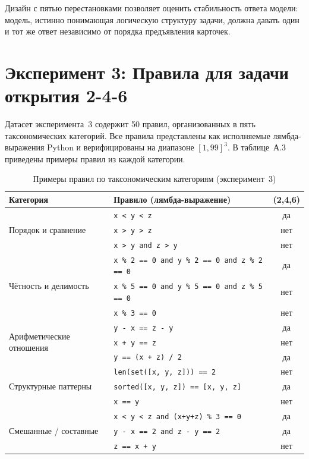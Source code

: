 Дизайн с пятью перестановками позволяет оценить стабильность ответа модели: модель, истинно понимающая логическую структуру задачи, должна давать один и тот же ответ независимо от порядка предъявления карточек.

\section{Эксперимент 3: Правила для задачи открытия 2-4-6}
\label{sec:appA_246}

Датасет эксперимента~3 содержит 50 правил, организованных в пять таксономических категорий. Все правила представлены как исполняемые лямбда-выражения Python и верифицированы на диапазоне $[1, 99]^3$. В таблице~А.3 приведены примеры правил из каждой категории.

\begin{table}[h!]
\caption{Примеры правил по таксономическим категориям (эксперимент~3)}
\label{tab:appA_rules}
\centering
\begin{tabular}{|l|l|c|}
\hline
\textbf{Категория} & \textbf{Правило (лямбда-выражение)} & \textbf{(2,4,6)} \\
\hline
\multirow{3}{*}{Порядок и сравнение}
  & \texttt{x < y < z} & да \\
  & \texttt{x > y > z} & нет \\
  & \texttt{x > y and z > y} & нет \\
\hline
\multirow{3}{*}{Чётность и делимость}
  & \texttt{x \% 2 == 0 and y \% 2 == 0 and z \% 2 == 0} & да \\
  & \texttt{x \% 5 == 0 and y \% 5 == 0 and z \% 5 == 0} & нет \\
  & \texttt{x \% 3 == 0} & нет \\
\hline
\multirow{3}{*}{Арифметические отношения}
  & \texttt{y - x == z - y} & да \\
  & \texttt{x + y == z} & нет \\
  & \texttt{y == (x + z) / 2} & да \\
\hline
\multirow{3}{*}{Структурные паттерны}
  & \texttt{len(set([x, y, z])) == 2} & нет \\
  & \texttt{sorted([x, y, z]) == [x, y, z]} & да \\
  & \texttt{x == y} & нет \\
\hline
\multirow{3}{*}{Смешанные / составные}
  & \texttt{x < y < z and (x+y+z) \% 3 == 0} & да \\
  & \texttt{y - x == 2 and z - y == 2} & да \\
  & \texttt{z == x + y} & нет \\
\hline
\end{tabular}
\end{table}

